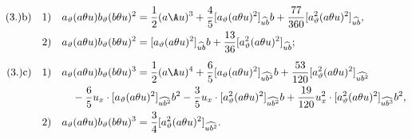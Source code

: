 
\[
\begin{aligned}
(3.)\mathrm{b)}\quad 1)&\quad a_\vartheta(a\theta u)b_\vartheta(b\theta u)^2=\frac12(a\A u)^3+\frac45[a_\vartheta(a\theta u)^2]_{\widehat{ub}}b+\frac{77}{360}[a_\vartheta^2(a\theta u)^2]_{\widehat{ub}},\\
2)&\quad a_\vartheta(a\theta u)b_\vartheta(b\theta u)^2=[a_\vartheta(a\theta u)^2]_{\widehat{ub}}b+\frac{13}{36}[a_\vartheta^2(a\theta u)^2]_{\widehat{ub}};\\[0.5em]
(3.)\mathrm{c)}\quad 1)&\quad a_\vartheta(a\theta u)b_\vartheta(b\theta u)^3=\frac12(a\A u)^4+\frac65[a_\vartheta(a\theta u)^2]_{\widehat{ub^2}}b+\frac{53}{120}[a_\vartheta^2(a\theta u)^2]_{\widehat{ub^2}}\\
&\qquad-\frac65u_x\cdot[a_\vartheta(a\theta u)^2]_{\widehat{ub^2}}b^2-\frac35u_x\cdot[a_\vartheta^2(a\theta u)^2]_{\widehat{ub^2}}b+\frac{19}{120}u_x^2\cdot[a_\vartheta^2(a\theta u)^2]_{\widehat{ub^3}}b^2,\\
2)&\quad a_\vartheta(a\theta u)b_\vartheta(b\theta u)^3=\frac34[a_\vartheta^2(a\theta u)^2]_{\widehat{ub^2}}.
\end{aligned}
\]
